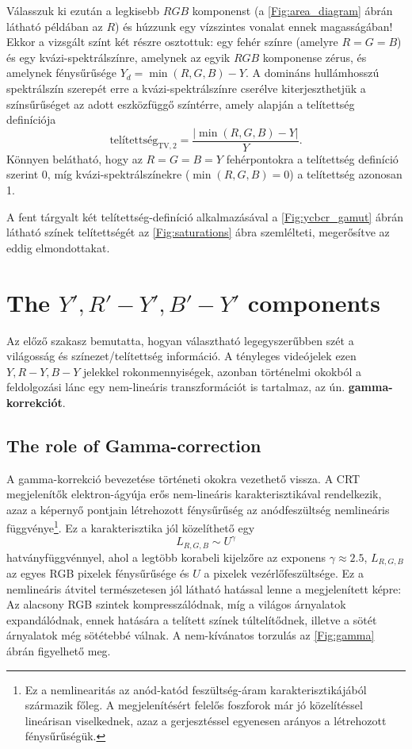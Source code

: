 \begin{itemize}
Válasszuk ki ezután a legkisebb $RGB$ komponenst (a \ref{Fig:area_diagram} ábrán látható példában az $R$) és húzzunk egy vízszintes vonalat ennek magasságában!
Ekkor a vizsgált színt két részre osztottuk: egy fehér színre (amelyre $R=G=B$) és egy kvázi-spektrálszínre, amelynek az egyik $RGB$ komponense zérus, és amelynek fénysűrűsége $Y_d = \min (R,G,B) - Y$.
A domináns hullámhosszú spektrálszín szerepét erre a kvázi-spektrálszínre cserélve kiterjeszthetjük a színsűrűséget az adott eszközfüggő színtérre, amely alapján a telítettség definíciója
\begin{equation}
\text{telítettség}_{\mathrm{TV},2} = \frac{| \min(R,G,B) - Y |}{Y}.
\label{eq:saturation_2}
\end{equation}
Könnyen belátható, hogy az $R = G=B=Y$ fehérpontokra a telítettség definíció szerint 0, míg kvázi-spektrálszínekre ($\min(R,G,B) = 0$) a telítettség azonosan 1.
\end{itemize}
A fent tárgyalt két telítettség-definíció alkalmazásával a \ref{Fig:ycbcr_gamut} ábrán látható színek telítettségét az \ref{Fig:saturations} ábra szemlélteti, megerősítve az eddig elmondottakat.
%
\section{The $Y', R'-Y', B'-Y'$ components}

Az előző szakasz bemutatta, hogyan választható legegyszerűbben szét a világosság és színezet/telítettség információ.
A tényleges videójelek ezen $Y, R-Y, B-Y$ jelekkel rokonmennyiségek, azonban történelmi okokból a feldolgozási lánc egy nem-lineáris transzformációt is tartalmaz, az ún. \textbf{gamma-korrekciót}.

\subsection{The role of Gamma-correction}
A gamma-korrekció bevezetése történeti okokra vezethető vissza.
A CRT megjelenítők elektron-ágyúja erős nem-lineáris karakterisztikával rendelkezik, azaz a képernyő pontjain létrehozott fénysűrűség az anódfeszültség nemlineáris függvénye\footnote{Ez a nemlinearitás az anód-katód feszültség-áram karakterisztikájából származik főleg.
A megjelenítésért felelős foszforok már jó közelítéssel lineárisan viselkednek, azaz a gerjesztéssel egyenesen arányos a létrehozott fénysűrűségük.}.
Ez a karakterisztika jól közelíthető egy 
\begin{equation}
L_{R,G,B} \sim U^{\gamma}
\end{equation} 
hatványfüggvénnyel, ahol a legtöbb korabeli kijelzőre az exponens $\gamma \approx 2.5$, $L_{R,G,B}$ az egyes RGB pixelek fénysűrűsége és $U$ a pixelek vezérlőfeszültsége.
Ez a nemlineáris átvitel természetesen jól látható hatással lenne a megjelenített képre:
Az alacsony RGB szintek kompresszálódnak, míg a világos árnyalatok expandálódnak, ennek hatására a telített színek túltelítődnek, illetve a sötét árnyalatok még sötétebbé válnak.
A nem-kívánatos torzulás az \ref{Fig:gamma} ábrán figyelhető meg.

